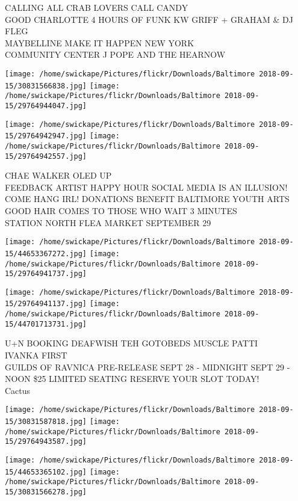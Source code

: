 \documentclass[10pt,letterpaper]{article}
\begin{document}
CALLING ALL CRAB LOVERS CALL CANDY\\
GOOD CHARLOTTE 4 HOURS OF FUNK KW GRIFF + GRAHAM \& DJ FLEG\\
MAYBELLINE MAKE IT HAPPEN NEW YORK\\
COMMUNITY CENTER J POPE AND THE HEARNOW
\pagebreak

\texttt{[image: /home/swickape/Pictures/flickr/Downloads/Baltimore 2018-09-15/30831566838.jpg]}
\texttt{[image: /home/swickape/Pictures/flickr/Downloads/Baltimore 2018-09-15/29764944047.jpg]}

\texttt{[image: /home/swickape/Pictures/flickr/Downloads/Baltimore 2018-09-15/29764942947.jpg]}
\texttt{[image: /home/swickape/Pictures/flickr/Downloads/Baltimore 2018-09-15/29764942557.jpg]}

CHAE WALKER OLED UP\\
FEEDBACK ARTIST HAPPY HOUR SOCIAL MEDIA IS AN ILLUSION!  COME HANG IRL!  DONATIONS BENEFIT BALTIMORE YOUTH ARTS\\
GOOD HAIR COMES TO THOSE WHO WAIT 3 MINUTES\\
STATION NORTH FLEA MARKET SEPTEMBER 29
\pagebreak

\texttt{[image: /home/swickape/Pictures/flickr/Downloads/Baltimore 2018-09-15/44653367272.jpg]}
\texttt{[image: /home/swickape/Pictures/flickr/Downloads/Baltimore 2018-09-15/29764941737.jpg]}

\texttt{[image: /home/swickape/Pictures/flickr/Downloads/Baltimore 2018-09-15/29764941137.jpg]}
\texttt{[image: /home/swickape/Pictures/flickr/Downloads/Baltimore 2018-09-15/44701713731.jpg]}

U+N BOOKING DEAFWISH TEH GOTOBEDS MUSCLE PATTI\\
IVANKA FIRST\\
GUILDS OF RAVNICA PRE{-}RELEASE SEPT 28 {-} MIDNIGHT SEPT 29 {-} NOON \$25 LIMITED SEATING RESERVE YOUR SLOT TODAY!\\
Cactus
\pagebreak

\texttt{[image: /home/swickape/Pictures/flickr/Downloads/Baltimore 2018-09-15/30831587818.jpg]}
\texttt{[image: /home/swickape/Pictures/flickr/Downloads/Baltimore 2018-09-15/29764943587.jpg]}

\texttt{[image: /home/swickape/Pictures/flickr/Downloads/Baltimore 2018-09-15/44653365102.jpg]}
\texttt{[image: /home/swickape/Pictures/flickr/Downloads/Baltimore 2018-09-15/30831566278.jpg]}
\end{document}

